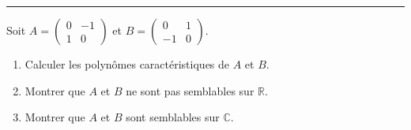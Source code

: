 \documentclass[../PolyS4.tex]{subfiles}
\begin{document}
\vspace{1em}
\hrule
\vspace{1em}


Soit $A = \begin{pmatrix} 0 & -1 \\ 1 & 0 \end{pmatrix}$ et $B = \begin{pmatrix} 0 & 1 \\ -1 & 0 \end{pmatrix}$.
\begin{enumerate}
    \item Calculer les polynômes caractéristiques de $A$ et $B$.
    \item Montrer que $A$ et $B$ ne sont pas semblables sur $\mathbb{R}$.
    \item Montrer que $A$ et $B$ sont semblables sur $\mathbb{C}$.
\end{enumerate}
\end{document}
